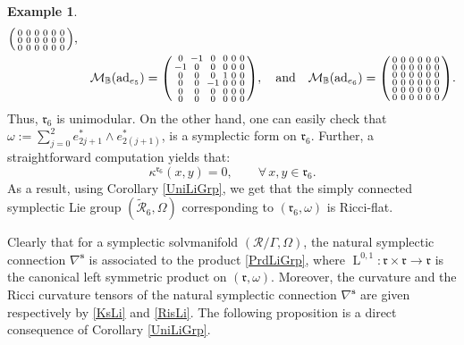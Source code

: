 \documentclass[preprint,12pt,1p]{elsarticle}
\theoremstyle{plain}
\theoremstyle{definition}
\newtheorem{example}[theorem]{Example}
\newcommand{\n}{\nabla}
\newcommand{\ns}{\n^\mathbf{s}}
\newcommand{\w}{\omega}
\newcommand{\et}{\quad \textnormal{and}\quad}
\newcommand{\ad}{\operatorname{ad}}
\newcommand{\la}{\operatorname{L}^{0,1}}
\numberwithin{equation}{section}
\begin{document}
\begin{example}
\begin{eqnarray*}
\begin{psmallmatrix}
		\\
		0 & 0 & 0 & 0 & 0 & 0 
		\\
		0 & 0 & 0 & 0 & 0 & 0 
		\\
		0 & 0 & 0 & 0 & 0 & 0 
	\end{psmallmatrix},\\
	&&\mathcal{M}_\mathbb{B}(\ad_{e_5})=\begin{psmallmatrix}
		0 & -1 & 0 & 0 & 0 & 0 
		\\
		-1 & 0 & 0 & 0 & 0 & 0 
		\\
		0 & 0 & 0 & 1 & 0 & 0 
		\\
		0 & 0 & -1 & 0 & 0 & 0 
		\\
		0 & 0 & 0 & 0 & 0 & 0 
		\\
		0 & 0 & 0 & 0 & 0 & 0 
	\end{psmallmatrix},\et
	\mathcal{M}_\mathbb{B}(\ad_{e_6})=\begin{psmallmatrix}
		0 & 0 & 0 & 0 & 0 & 0 
		\\
		0 & 0 & 0 & 0 & 0 & 0 
		\\
		0 & 0 & 0 & 0 & 0 & 0 
		\\
		0 & 0 & 0 & 0 & 0 & 0 
		\\
		0 & 0 & 0 & 0 & 0 & 0 
		\\
		0 & 0 & 0 & 0 & 0 & 0 
	\end{psmallmatrix}.
\end{eqnarray*}
Thus, $\mathfrak{r}_6$ is unimodular. On the other hand, one can easily check that $\w:=\sum_{j=0}^2e^*_{2j+1}\wedge e^*_{2(j+1)}$, is a symplectic form on $\mathfrak{r}_6$. Further, a straightforward computation yields that:
\begin{equation*}
	\kappa^{\mathfrak{r}_6}(x,y)=0,\qquad\forall\,x,y\in\mathfrak{r}_6.
\end{equation*}
As a result, using Corollary \ref{UniLiGrp}, we get that the simply connected symplectic Lie group $(\widetilde{\mathcal{R}}_6,\Omega)$ corresponding to $(\mathfrak{r}_6,\w)$ is Ricci-flat.
\end{example}

Clearly that for a symplectic solvmanifold $(\mathcal{R}/\Gamma,\Omega)$, the natural symplectic connection $\ns$ is associated to the product \eqref{PrdLiGrp}, where $\la:\mathfrak{r}\times\mathfrak{r}\to\mathfrak{r}$ is the canonical left symmetric product on $(\mathfrak{r},\omega)$. Moreover, the curvature and the Ricci curvature tensors of the natural symplectic connection $\ns$ are given respectively by \eqref{KsLi} and \eqref{RisLi}. The following proposition is a direct consequence of Corollary \ref{UniLiGrp}.
\end{document}
